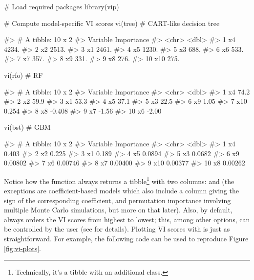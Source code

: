 \begin{Schunk}
\begin{Sinput}
# Load required packages
library(vip)

# Compute model-specific VI scores
vi(tree)  # CART-like decision tree
\end{Sinput}
\begin{Soutput}
#> # A tibble: 10 x 2
#>    Variable Importance
#>    <chr>         <dbl>
#>  1 x4            4234.
#>  2 x2            2513.
#>  3 x1            2461.
#>  4 x5            1230.
#>  5 x3             688.
#>  6 x6             533.
#>  7 x7             357.
#>  8 x9             331.
#>  9 x8             276.
#> 10 x10            275.
\end{Soutput}
\begin{Sinput}
vi(rfo)   # RF
\end{Sinput}
\begin{Soutput}
#> # A tibble: 10 x 2
#>    Variable Importance
#>    <chr>         <dbl>
#>  1 x4           74.2  
#>  2 x2           59.9  
#>  3 x1           53.3  
#>  4 x5           37.1  
#>  5 x3           22.5  
#>  6 x9            1.05 
#>  7 x10           0.254
#>  8 x8           -0.408
#>  9 x7           -1.56 
#> 10 x6           -2.00
\end{Soutput}
\begin{Sinput}
vi(bst)   # GBM
\end{Sinput}
\begin{Soutput}
#> # A tibble: 10 x 2
#>    Variable Importance
#>    <chr>         <dbl>
#>  1 x4          0.403  
#>  2 x2          0.225  
#>  3 x1          0.189  
#>  4 x5          0.0894 
#>  5 x3          0.0682 
#>  6 x9          0.00802
#>  7 x6          0.00746
#>  8 x7          0.00400
#>  9 x10         0.00377
#> 10 x8          0.00262
\end{Soutput}
\end{Schunk}

Notice how the  function always returns a
tibble\footnote{Technically, it's a tibble with an additional  class.}
with two columns:  and  (the exceptions
are coefficient-based models which also include a  column
giving the sign of the corresponding coefficient, and permutation
importance involving multiple Monte Carlo simulations, but more on that
later). Also, by default,  always orders the VI scores from
highest to lowest; this, among other options, can be controlled by the
user (see  for details). Plotting VI scores with
 is just as straightforward. For example, the following code
can be used to reproduce Figure \ref{fig:vi-plots}.


